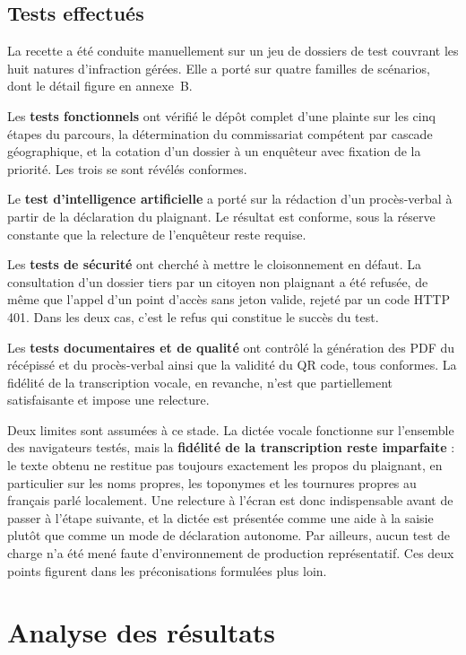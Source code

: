 \subsection{Tests effectués}

La recette a été conduite manuellement sur un jeu de dossiers de test couvrant les huit natures d'infraction gérées. Elle a porté sur quatre familles de scénarios, dont le détail figure en annexe~B.

Les \textbf{tests fonctionnels} ont vérifié le dépôt complet d'une plainte sur les cinq étapes du parcours, la détermination du commissariat compétent par cascade géographique, et la cotation d'un dossier à un enquêteur avec fixation de la priorité. Les trois se sont révélés conformes.

Le \textbf{test d'intelligence artificielle} a porté sur la rédaction d'un procès-verbal à partir de la déclaration du plaignant. Le résultat est conforme, sous la réserve constante que la relecture de l'enquêteur reste requise.

Les \textbf{tests de sécurité} ont cherché à mettre le cloisonnement en défaut. La consultation d'un dossier tiers par un citoyen non plaignant a été refusée, de même que l'appel d'un point d'accès sans jeton valide, rejeté par un code HTTP 401. Dans les deux cas, c'est le refus qui constitue le succès du test.

Les \textbf{tests documentaires et de qualité} ont contrôlé la génération des PDF du récépissé et du procès-verbal ainsi que la validité du QR code, tous conformes. La fidélité de la transcription vocale, en revanche, n'est que partiellement satisfaisante et impose une relecture.

Deux limites sont assumées à ce stade. La dictée vocale fonctionne sur l'ensemble des navigateurs testés, mais la \textbf{fidélité de la transcription reste imparfaite} : le texte obtenu ne restitue pas toujours exactement les propos du plaignant, en particulier sur les noms propres, les toponymes et les tournures propres au français parlé localement. Une relecture à l'écran est donc indispensable avant de passer à l'étape suivante, et la dictée est présentée comme une aide à la saisie plutôt que comme un mode de déclaration autonome. Par ailleurs, aucun test de charge n'a été mené faute d'environnement de production représentatif. Ces deux points figurent dans les préconisations formulées plus loin.

\section{Analyse des résultats}

